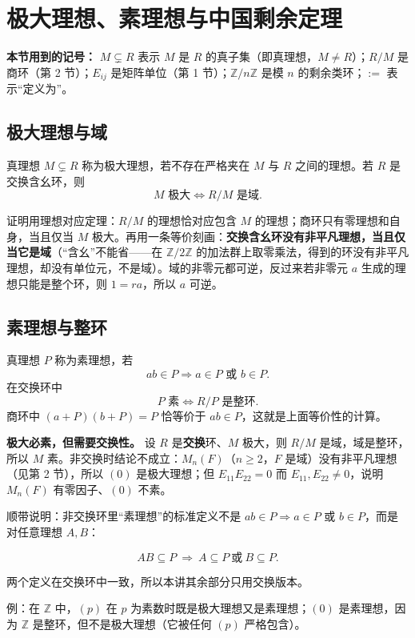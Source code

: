 \section{极大理想、素理想与中国剩余定理}


\textbf{本节用到的记号：} $M\subsetneq R$ 表示 $M$ 是 $R$ 的真子集（即真理想，$M\ne R$）；$R/M$ 是商环（第 2 节）；$E_{ij}$ 是矩阵单位（第 1 节）；$\mathbb Z/n\mathbb Z$ 是模 $n$ 的剩余类环；$:=$ 表示“定义为”。

\subsection{极大理想与域}


真理想 $M\subsetneq R$ 称为极大理想，若不存在严格夹在 $M$ 与 $R$ 之间的理想。若 $R$ 是交换含幺环，则
\[M\text{ 极大}\iff R/M\text{ 是域}.\]

证明用理想对应定理：$R/M$ 的理想恰对应包含 $M$ 的理想；商环只有零理想和自身，当且仅当 $M$ 极大。再用一条等价刻画：\textbf{交换含幺环没有非平凡理想，当且仅当它是域}（“含幺”不能省——在 $\mathbb Z/2\mathbb Z$ 的加法群上取零乘法，得到的环没有非平凡理想，却没有单位元，不是域）。域的非零元都可逆，反过来若非零元 $a$ 生成的理想只能是整个环，则 $1=ra$，所以 $a$ 可逆。

\subsection{素理想与整环}


真理想 $P$ 称为素理想，若
\[ab\in P\Longrightarrow a\in P\text{ 或 }b\in P.\]
在交换环中
\[P\text{ 素}\iff R/P\text{ 是整环}.\]
商环中 $(a+P)(b+P)=P$ 恰等价于 $ab\in P$，这就是上面等价性的计算。

\textbf{极大必素，但需要交换性。} 设 $R$ 是\textbf{交换}环、$M$ 极大，则 $R/M$ 是域，域是整环，所以 $M$ 素。非交换时结论不成立：$M_n(F)$（$n\ge2$，$F$ 是域）没有非平凡理想（见第 2 节），所以 $(0)$ 是极大理想；但 $E_{11}E_{22}=0$ 而 $E_{11},E_{22}\ne0$，说明 $M_n(F)$ 有零因子、$(0)$ 不素。

顺带说明：非交换环里“素理想”的标准定义不是 $ab\in P\Rightarrow a\in P$ 或 $b\in P$，而是对任意理想 $A,B$：

\[
AB\subseteq P\ \Longrightarrow\ A\subseteq P\ \text{或}\ B\subseteq P .
\]

两个定义在交换环中一致，所以本讲其余部分只用交换版本。

例：在 $\mathbb Z$ 中，$(p)$ 在 $p$ 为素数时既是极大理想又是素理想；$(0)$ 是素理想，因为 $\mathbb Z$ 是整环，但不是极大理想（它被任何 $(p)$ 严格包含）。


